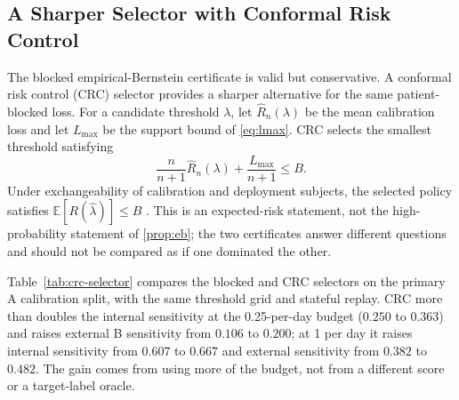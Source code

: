 \subsection{A Sharper Selector with Conformal Risk Control}
\label{sec:crc}

The blocked empirical-Bernstein certificate is valid but conservative. A conformal risk control (CRC) selector provides a sharper alternative for the same patient-blocked loss. For a candidate threshold $\lambda$, let $\widehat R_n(\lambda)$ be the mean calibration loss and let $L_{\max}$ be the support bound of \cref{eq:lmax}. CRC selects the smallest threshold satisfying
\begin{equation}
\label{eq:crc}
\frac{n}{n+1}\widehat R_n(\lambda)+\frac{L_{\max}}{n+1}\le B .
\end{equation}
Under exchangeability of calibration and deployment subjects, the selected policy satisfies $\mathbb{E}[R(\widehat\lambda)]\le B$ \citep{angelopoulos2022conformal}. This is an expected-risk statement, not the high-probability statement of \cref{prop:eb}; the two certificates answer different questions and should not be compared as if one dominated the other.

Table~\ref{tab:crc-selector} compares the blocked and CRC selectors on the primary A calibration split, with the same threshold grid and stateful replay. CRC more than doubles the internal sensitivity at the 0.25-per-day budget ($0.250$ to $0.363$) and raises external B sensitivity from $0.106$ to $0.200$; at 1 per day it raises internal sensitivity from $0.607$ to $0.667$ and external sensitivity from $0.382$ to $0.482$. The gain comes from using more of the budget, not from a different score or a target-label oracle.

\begin{table}[tb]
\centering
\caption{Blocked empirical-Bernstein versus conformal risk control on the primary A calibration split, with the A-calibrated threshold transported to B. ``Cert.'' is the CRC certified risk on the calibration subjects; the request is the budget. CRC controls expected risk, whereas the blocked selector controls the probability of exceeding the budget.}
\label{tab:crc-selector}
\small
{}
\end{table}

